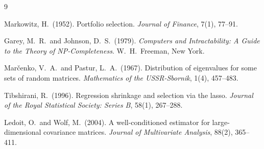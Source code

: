 \documentclass[11pt]{article}
\begin{document}
\begin{thebibliography}{9}

Markowitz, H.\ (1952).
Portfolio selection.
\textit{Journal of Finance}, 7(1), 77--91.

Garey, M.~R.\ and Johnson, D.~S.\ (1979).
\textit{Computers and Intractability: A Guide to the Theory of
NP-Completeness}.
W.~H.\ Freeman, New York.

Mar\v{c}enko, V.~A.\ and Pastur, L.~A.\ (1967).
Distribution of eigenvalues for some sets of random matrices.
\textit{Mathematics of the USSR-Sbornik}, 1(4), 457--483.

Tibshirani, R.\ (1996).
Regression shrinkage and selection via the lasso.
\textit{Journal of the Royal Statistical Society: Series B}, 58(1), 267--288.

Ledoit, O.\ and Wolf, M.\ (2004).
A well-conditioned estimator for large-dimensional covariance matrices.
\textit{Journal of Multivariate Analysis}, 88(2), 365--411.

\end{thebibliography}
\end{document}
